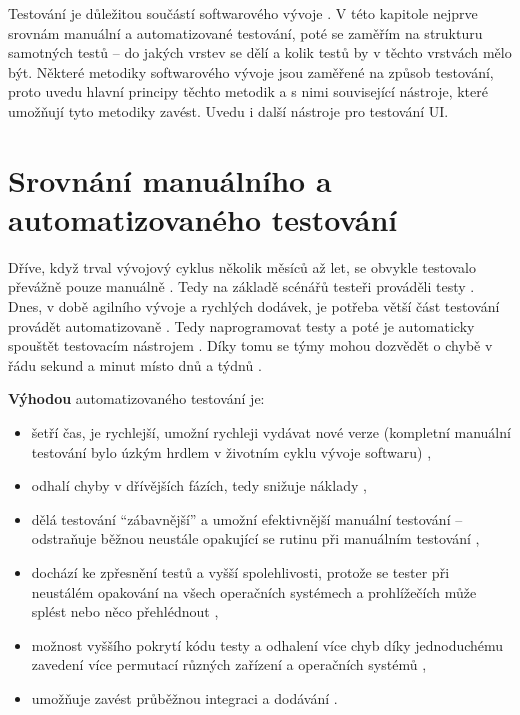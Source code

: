 Testování je důležitou součástí softwarového vývoje \cite{test-bdo}. V této kapitole nejprve srovnám manuální a automatizované testování, poté se zaměřím na strukturu samotných testů -- do jakých vrstev se dělí a kolik testů by v těchto vrstvách mělo být. Některé metodiky softwarového vývoje jsou zaměřené na způsob testování, proto uvedu hlavní principy těchto metodik a s nimi související nástroje, které umožňují tyto metodiky zavést. Uvedu i další nástroje pro testování UI.

\section{Srovnání manuálního a automatizovaného testování}
Dříve, když trval vývojový cyklus několik měsíců až let, se obvykle testovalo převážně pouze manuálně \cite{test-kitner}. Tedy na základě scénářů testeři prováděli testy \cite{test-bdo}. Dnes, v době agilního vývoje a rychlých dodávek, je potřeba větší část testování provádět automatizovaně \cite{test-kitner}. Tedy naprogramovat testy a poté je automaticky spouštět testovacím nástrojem \cite{test-bdo}. Díky tomu se týmy mohou dozvědět o chybě v řádu sekund a minut místo dnů a týdnů \cite{test-fowler}.

\textbf{Výhodou} automatizovaného testování je:
\begin{itemize}
    \item šetří čas, je rychlejší, umožní rychleji vydávat nové verze (kompletní manuální testování bylo úzkým hrdlem v životním cyklu vývoje softwaru) \cite{test-kitner, test-genez, test-cd},
    \item odhalí chyby v dřívějších fázích, tedy snižuje náklady \cite{test-kitner},
    \item dělá testování \enquote{zábavnější} a umožní efektivnější manuální testování -- odstraňuje běžnou neustále opakující se rutinu při manuálním testování \cite{test-kitner, test-perfecto},
    \item dochází ke zpřesnění testů a vyšší spolehlivosti, protože se tester při neustálém opakování na všech operačních systémech a prohlížečích může splést nebo něco přehlédnout \cite{test-kitner, test-genez},
    \item možnost vyššího pokrytí kódu testy a odhalení více chyb díky jednoduchému zavedení více permutací různých zařízení a operačních systémů \cite{test-perfecto},
    \item umožňuje zavést průběžnou integraci a dodávání \cite{test-kitner2}.
\end{itemize}

